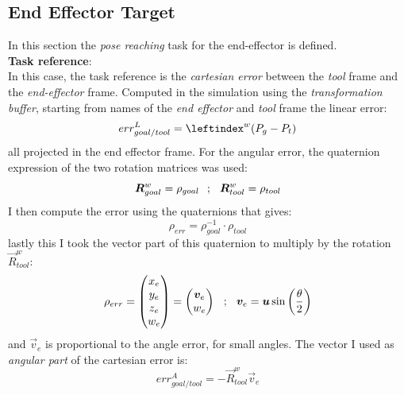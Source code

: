 \subsection{End Effector Target}
In this section the \textit{pose reaching} task for the end-effector is defined.\\
\noindent \textbf{Task reference}:\\
In this case, the task reference is the \textit{cartesian error} between the \textit{tool} frame and the \textit{end-effector} frame.
Computed in the simulation using the \textit{transformation buffer}, starting from names of the \textit{end effector} and \textit{tool} frame the linear error:
\begin{equation}
	err_{goal/tool}^{L} = \leftindex^{w}{(P_g - P_t)}
\end{equation}
all projected in the end effector frame. For the angular error, the quaternion expression of the two rotation matrices was used:
\begin{equation}
	\vec{R}_{goal}^{w} = \rho_{goal} \hspace{0,25cm};\hspace{0,25cm} \vec{R}_{tool}^{w} = \rho_{tool}
\end{equation}
I then compute the error using the quaternions that gives:
\begin{equation}
	\rho_{err} = \rho_{goal}^{-1} \cdot \rho_{tool}
\end{equation}
lastly this I took the vector part of this quaternion to multiply by the rotation $\vec{R}_{tool}^{w}$:
\begin{equation}
	\rho_{err} = 
	\begin{pmatrix}
		x_e \\
		y_e \\
		z_e \\
		w_e
	\end{pmatrix} =
	\begin{pmatrix}
		\vec{v}_e \\
		w_e
	\end{pmatrix}
	\hspace{0,25cm};\hspace{0,25cm}
	\vec{v}_e = \vec{u}\sin\left(\frac{\theta}{2}\right)
\end{equation}
and $\vec{v}_e$ is proportional to the angle error, for small angles. The vector I used as \textit{angular part} of the cartesian error is: 
\begin{equation}
	err_{goal/tool}^{A} = - \vec{R}_{tool}^{w} \vec{v}_e
\end{equation}

